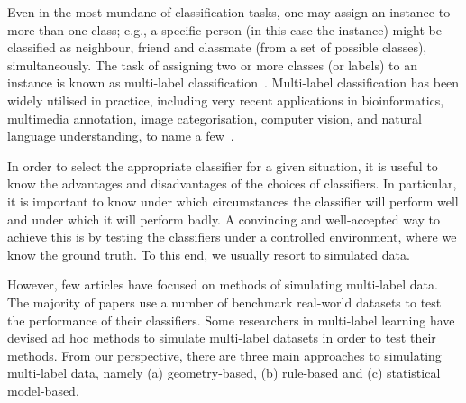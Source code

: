 \documentclass[review]{elsarticle}
\begin{document}
Even in the most mundane of classification tasks, one may assign an instance to more than one class; e.g., a specific person (in this case the instance) might be classified as neighbour, friend and classmate (from a set of possible classes), simultaneously. The task of assigning two or more classes (or labels) to an instance is known as multi-label classification~\citep{Tsoumakas:07, de2009tutorial, zhang2014review, Gibaja:15}. Multi-label classification has been widely utilised in practice, including very recent applications in bioinformatics, multimedia annotation, image categorisation, computer vision, and natural language understanding, to name a few~\citep{Tsoumakas:07, zhang2014review, meng2016plant, li2016conditional, hou2016multi, ivasic2016two, wu2015multi, zhao2015multi, zhao2015joint, yang2016exploiting, li2015supervised, li2015centroid}.

In order to select the appropriate classifier for a given situation, it is useful to know the advantages and disadvantages of the choices of classifiers. In particular, it is important to know under which circumstances the classifier will perform well and under which it will perform badly. A convincing and well-accepted way to achieve this is by testing the classifiers under a controlled environment, where we know the ground truth. To this end, we usually resort to simulated data.

However, few articles have focused on methods of simulating multi-label data. The majority of papers use a number of benchmark real-world datasets to test the performance of their classifiers. Some researchers in multi-label learning have devised ad hoc methods to simulate multi-label datasets in order to test their methods.
From our perspective, there are three main approaches to simulating multi-label data, namely (a) geometry-based, (b) rule-based and (c) statistical model-based.
\end{document}
